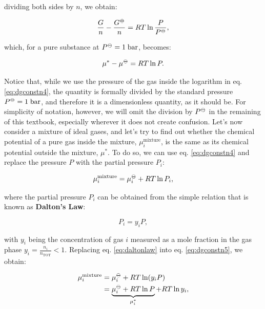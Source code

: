 \documentclass[
  9pt,
]{extbook}
\theoremstyle{definition}
\theoremstyle{definition}
\theoremstyle{definition}
\theoremstyle{definition}
\theoremstyle{remark}
\begin{document}
dividing both sides by \(n\), we obtain:

\begin{equation}
\frac{G}{n} - \frac{G^{-\kern-6pt{\ominus}\kern-6pt-}}{n} = RT \ln \frac{P}{P^{-\kern-6pt{\ominus}\kern-6pt-}},
\label{eq:dgconstn3}
\end{equation}

which, for a pure substance at \(P^{-\kern-6pt{\ominus}\kern-6pt-}= 1 \;\text{bar}\), becomes:

\begin{equation}
\mu^* - \mu^{-\kern-6pt{\ominus}\kern-6pt-}=      RT \ln P.
\label{eq:dgconstn4}
\end{equation}

Notice that, while we use the pressure of the gas inside the logarithm in eq. \eqref{eq:dgconstn4}, the quantity is formally divided by the standard pressure \(P^{-\kern-6pt{\ominus}\kern-6pt-}= 1 \;\text{bar}\), and therefore it is a dimensionless quantity, as it should be. For simplicity of notation, however, we will omit the division by \(P^{-\kern-6pt{\ominus}\kern-6pt-}\) in the remaining of this textbook, especially wherever it does not create confusion.
Let's now consider a mixture of ideal gases, and let's try to find out whether the chemical potential of a pure gas inside the mixture, \(\mu_i^{\text{mixture}}\), is the same as its chemical potential outside the mixture, \(\mu^*\).
To do so, we can use eq. \eqref{eq:dgconstn4} and replace the pressure \(P\) with the partial pressure \(P_i\):

\begin{equation}
\mu_i^{\text{mixture}} = \mu_i^{-\kern-6pt{\ominus}\kern-6pt-}+ RT \ln P_i,
\label{eq:dgconstn5}
\end{equation}

where the partial pressure \(P_i\) can be obtained from the simple relation that is known as \textbf{Dalton's Law}:

\begin{equation}
P_i = y_i P,
\label{eq:daltonlaw}
\end{equation}

with \(y_i\) being the concentration of gas \(i\) measured as a mole fraction in the gas phase \(y_i=\frac{n_i}{n_{\text{TOT}}} < 1\). Replacing eq. \eqref{eq:daltonlaw} into eq. \eqref{eq:dgconstn5}, we obtain:

\begin{equation}
\begin{aligned}
\mu_i^{\text{mixture}} &= \mu_i^{-\kern-6pt{\ominus}\kern-6pt-}+ RT \ln (y_i P) \\
 &= \underbrace{\mu_i^{-\kern-6pt{\ominus}\kern-6pt-}+ RT \ln P}_{\mu_i^*} + RT \ln y_i,
\end{aligned}
\label{eq:dgconstn6}
\end{equation}
\end{document}

